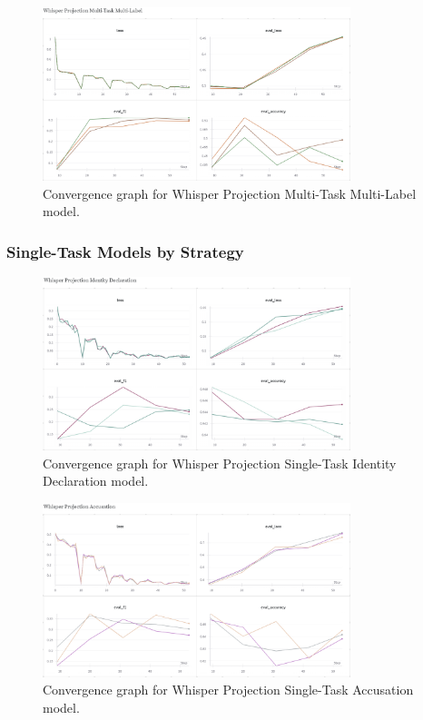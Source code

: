 \documentclass{article}
\begin{document}
\begin{figure}[H]
    \centering
    \includegraphics[width=0.8\textwidth]{convergence_graphs/whisper_proj_mtml.png}
    \caption{Convergence graph for Whisper Projection Multi-Task Multi-Label model.}
    \label{fig:whisper_proj_mtml}
\end{figure}

\subsubsection{Single-Task Models by Strategy}
\begin{figure}[H]
    \centering
    \includegraphics[width=0.8\textwidth]{convergence_graphs/whisper_proj_identity_declaration.png}
    \caption{Convergence graph for Whisper Projection Single-Task Identity Declaration model.}
    \label{fig:whisper_proj_identity_declaration}
\end{figure}

\begin{figure}[H]
    \centering
    \includegraphics[width=0.8\textwidth]{convergence_graphs/whisper_proj_accusation.png}
    \caption{Convergence graph for Whisper Projection Single-Task Accusation model.}
    \label{fig:whisper_proj_accusation}
\end{figure}
\end{document}

